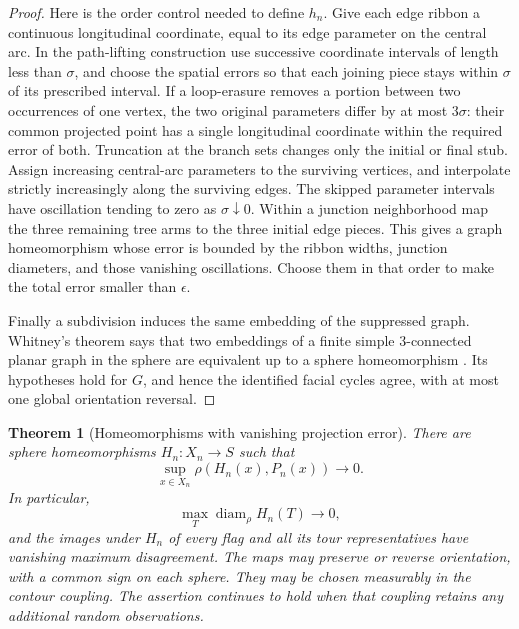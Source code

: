 \documentclass[11pt]{article}
\numberwithin{equation}{section}
\newtheorem{theorem}{Theorem}[section]
\theoremstyle{definition}
\theoremstyle{remark}
\newcommand{\1}{\mathbf 1}
\DeclareMathOperator{\diam}{diam}
\begin{document}
\begin{proof}
Here is the order control needed to define $h_n$.  Give each edge
ribbon a continuous longitudinal coordinate, equal to its edge
parameter on the central arc.  In the path-lifting construction use
successive coordinate intervals of length less than $\sigma$, and
choose the spatial errors so that each joining piece stays within
$\sigma$ of its prescribed interval.  If a loop-erasure removes a
portion between two occurrences of one vertex, the two original
parameters differ by at most $3\sigma$: their common projected
point has a single longitudinal coordinate within the required
error of both.  Truncation at the branch sets changes only the
initial or final stub.  Assign increasing central-arc parameters to
the surviving vertices, and interpolate strictly increasingly
along the surviving edges.  The skipped parameter intervals have
oscillation tending to zero as $\sigma\downarrow0$.
Within a junction neighborhood map the three remaining tree arms
to the three initial edge pieces.  This gives a graph homeomorphism
whose error is bounded by the ribbon widths, junction diameters,
and those vanishing oscillations.  Choose them in that order to
make the total error smaller than $\epsilon$.

Finally a subdivision induces the same embedding of the suppressed
graph.  Whitney's theorem says that two embeddings of a finite
simple $3$-connected planar graph in the sphere are equivalent up
to a sphere homeomorphism \cite{Whitney1932}.  Its hypotheses hold
for $G$, and hence the identified facial cycles agree, with at most
one global orientation reversal.
\end{proof}

\begin{theorem}[Homeomorphisms with vanishing projection error]
\label{top:homeomorphism}
There are sphere homeomorphisms $H_n:X_n\to S$ such that
\begin{equation}\label{top:homeomorphism-error}
 \sup_{x\in X_n}\rho(H_n(x),P_n(x))\longrightarrow0.
\end{equation}
In particular,
\begin{equation}\label{top:homeomorphism-mesh}
 \max_{T}\diam_\rho H_n(T)\longrightarrow0,
\end{equation}
and the images under $H_n$ of every flag and all its tour
representatives have vanishing maximum disagreement.  The maps may
preserve or reverse orientation, with a common sign on each sphere.
They may be chosen measurably in the contour coupling.  The assertion
continues to hold when that coupling retains any additional random
observations.
\end{theorem}
\end{document}
